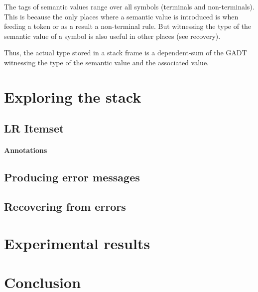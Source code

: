 \documentclass[twoside,a4paper]{article}
\begin{document}
The tags of semantic values range over all symbols (terminals and
non-terminals).  This is because the only places where a semantic value is
introduced is when feeding a token or as a result a non-terminal rule.  But
witnessing the type of the semantic value of a symbol is also useful in other
places (see recovery).


Thus, the actual type stored in a stack frame is a dependent-sum of the GADT
witnessing the type of the semantic value and the associated value.


\section{Exploring the stack}

\subsection{LR Itemset}

\paragraph{Annotations}

\subsection{Producing error messages}

\subsection{Recovering from errors}

\section{Experimental results}

\section{Conclusion}
\end{document}
